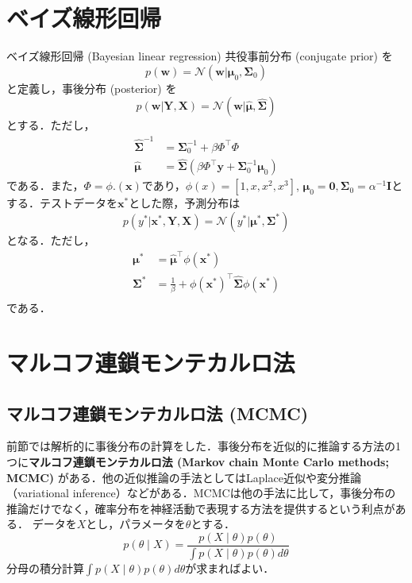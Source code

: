 \section{ベイズ線形回帰}
ベイズ線形回帰 (Bayesian linear regression)
共役事前分布 (conjugate prior) を
\begin{equation}
p(\mathbf{w})=\mathcal{N}(\mathbf{w}|\boldsymbol{\mu}_0, \boldsymbol{\Sigma}_0)
\end{equation}
と定義し，事後分布 (posterior) を
\begin{equation}
p(\mathbf{w}|\mathbf{Y}, \mathbf{X})=\mathcal{N}(\mathbf{w}|\hat{\boldsymbol{\mu}}, \hat{\boldsymbol{\Sigma}})
\end{equation}
とする．ただし，
\begin{align}
\hat{\boldsymbol{\Sigma}}^{-1}&= \boldsymbol{\Sigma}_0^{-1}+ \beta \Phi^\top\Phi\\
\hat{\boldsymbol{\mu}}&=\hat{\boldsymbol{\Sigma}} (\beta \Phi^\top \mathbf{y}+\boldsymbol{\Sigma}_0^{-1}\boldsymbol{\mu}_0)
\end{align}
である．また，$\Phi=\phi.(\mathbf{x})$であり，$\phi(x)=[1, x, x^2, x^3]$, $\boldsymbol{\mu}_0=\mathbf{0}, \boldsymbol{\Sigma}_0= \alpha^{-1} \mathbf{I}$とする．テストデータを$\mathbf{x}^*$とした際，予測分布は
\begin{equation}
p(y^*|\mathbf{x}^*, \mathbf{Y}, \mathbf{X})=\mathcal{N}(y^*|\boldsymbol{\mu}^*, \boldsymbol{\Sigma}^*)
\end{equation}
となる．ただし，
\begin{align}
\boldsymbol{\mu}^*&=\hat{\boldsymbol{\mu}}^\top \phi(\mathbf{x}^*)\\
\boldsymbol{\Sigma}^* &= \frac{1}{\beta} +  \phi(\mathbf{x}^*)^\top\hat{\boldsymbol{\Sigma}}\phi(\mathbf{x}^*)\\
\end{align}
である．
\section{マルコフ連鎖モンテカルロ法}
\subsection{マルコフ連鎖モンテカルロ法 (MCMC)}
前節では解析的に事後分布の計算をした．事後分布を近似的に推論する方法の1つに\textbf{マルコフ連鎖モンテカルロ法 (Markov chain Monte Carlo methods; MCMC)} がある．他の近似推論の手法としてはLaplace近似や変分推論（variational inference）などがある．MCMCは他の手法に比して，事後分布の推論だけでなく，確率分布を神経活動で表現する方法を提供するという利点がある．
データを$X$とし，パラメータを$\theta$とする．
\begin{equation}
p(\theta\mid X)=\frac{p(X\mid \theta)p(\theta)}{\int p(X\mid \theta)p(\theta)d\theta}
\end{equation}
分母の積分計算$\int p(X\mid \theta)p(\theta)d\theta$が求まればよい．
